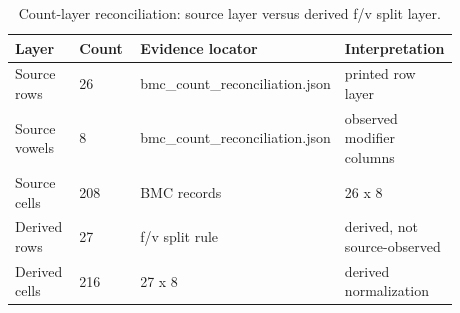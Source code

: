 \begin{table}[t]
\caption{Count-layer reconciliation: source layer versus derived f/v split layer.}
\label{tab:count-layers}
\small
\begin{tabular}{|p{0.22\linewidth}|p{0.22\linewidth}|p{0.22\linewidth}|p{0.22\linewidth}|}
\hline
Layer & Count & Evidence locator & Interpretation \\
\hline
Source rows & 26 & bmc\_count\_reconciliation.json & printed row layer \\
Source vowels & 8 & bmc\_count\_reconciliation.json & observed modifier columns \\
Source cells & 208 & BMC records & 26 x 8 \\
Derived rows & 27 & f/v split rule & derived, not source-observed \\
Derived cells & 216 & 27 x 8 & derived normalization \\
\hline
\end{tabular}
\end{table}
